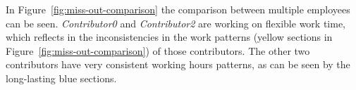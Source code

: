 In Figure~\ref{fig:miss-out-comparison} the comparison between multiple employees can be seen.
\emph{Contributor0} and \emph{Contributor2} are working on flexible work time, which reflects in the inconsistencies in the work patterns (yellow sections in Figure~\ref{fig:miss-out-comparison}) of those contributors.
The other two contributors have very consistent working hours patterns, as can be seen by the long-lasting blue sections.

